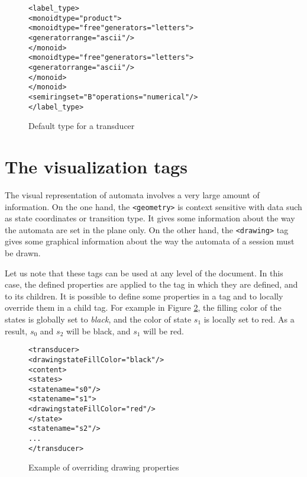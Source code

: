 \documentclass[a4paper]{article}
\def\geometrytag{\texttt{<geometry>}}
\def\drawingtag{\texttt{<drawing>}}
\begin{document}
\begin{figure}[h]
  \begin{center}
\begin{alltt}
<label_type>
  <monoid type="product">
     <monoid type="free" generators="letters">
       <generator range="ascii"/>
     </monoid>
     <monoid type="free" generators="letters">
       <generator range="ascii"/>
     </monoid>
  </monoid>
  <semiring set="B" operations="numerical"/>
</label_type>
\end{alltt}

\caption{Default type for a transducer}
\label{transducertype}
  \end{center}
\end{figure}

\newpage
\section{The visualization tags}
\label{title_vizualisation}
The visual representation of automata involves a very large amount of
information. On the one hand, the \geometrytag{} is context sensitive
with data such as state coordinates or transition type. It gives some
information about the way the automata are set in the plane only.  On
the other hand, the \drawingtag{} tag gives some graphical information
about the way the automata of a session must be drawn.

Let us note that these tags can be used at any level of the document. In this
case, the defined properties are applied to the tag in which they are defined,
and to its children. It is possible to define some properties in a tag and to
locally override them in a child tag. For example in Figure
\ref{override_properties}, the filling color of the states is globally set to
\textit{black}, and the color of state $s_1$ is locally set to red. As a
result, $s_0$ and $s_2$ will be black, and $s_1$ will be red.

{\small
\begin{figure}[h]
  \begin{center}
\begin{alltt}
<transducer>
  <drawing stateFillColor="black"/>
  <content>
     <states>
        <state name="s0"/>
        <state name="s1">
            <drawing stateFillColor="red"/>
        </state>
        <state name="s2"/>
      ...
</transducer>
\end{alltt}

\caption{Example of overriding drawing properties}
\label{override_properties}
  \end{center}
\end{figure}
}
\end{document}
